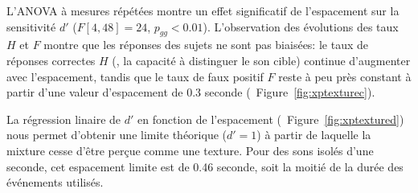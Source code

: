 L'ANOVA à mesures répétées montre un effet significatif de l'espacement sur la sensitivité $d'$ ($F[4,48]=24$, $p_{gg}<0.01$). L'observation des évolutions des taux $H$ et $F$ montre que les réponses des sujets ne sont pas biaisées: le taux de réponses correctes $H$ (\ie, la capacité à distinguer le son cible) continue d'augmenter avec l'espacement, tandis que le taux de faux positif $F$ reste à peu près constant à partir d'une valeur d'espacement de 0.3 seconde (\cf~Figure~\ref{fig:xptexturec}).

La régression linaire de $d'$ en fonction de l'espacement (\cf~Figure~\ref{fig:xptextured}) nous permet d'obtenir une limite théorique ($d'=1$) à partir de laquelle la mixture cesse d'être perçue comme une texture. Pour des sons isolés d'une seconde, cet espacement limite est de 0.46 seconde, soit la moitié de la durée des événements utilisés.

 


